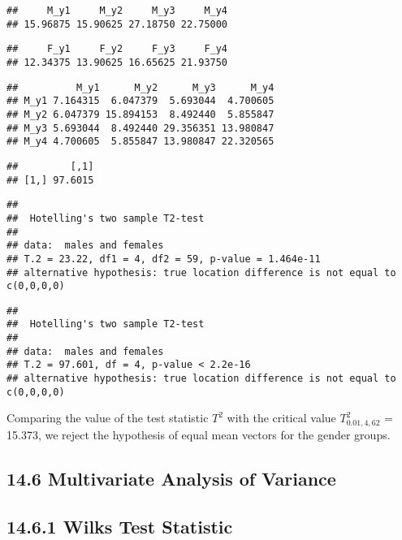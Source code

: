 \documentclass[]{article}
\begin{document}
\begin{verbatim}
##     M_y1     M_y2     M_y3     M_y4 
## 15.96875 15.90625 27.18750 22.75000
\end{verbatim}

\begin{verbatim}
##     F_y1     F_y2     F_y3     F_y4 
## 12.34375 13.90625 16.65625 21.93750
\end{verbatim}

\begin{verbatim}
##          M_y1      M_y2      M_y3      M_y4
## M_y1 7.164315  6.047379  5.693044  4.700605
## M_y2 6.047379 15.894153  8.492440  5.855847
## M_y3 5.693044  8.492440 29.356351 13.980847
## M_y4 4.700605  5.855847 13.980847 22.320565
\end{verbatim}

\begin{verbatim}
##         [,1]
## [1,] 97.6015
\end{verbatim}

\begin{verbatim}
## 
##  Hotelling's two sample T2-test
## 
## data:  males and females
## T.2 = 23.22, df1 = 4, df2 = 59, p-value = 1.464e-11
## alternative hypothesis: true location difference is not equal to c(0,0,0,0)
\end{verbatim}

\begin{verbatim}
## 
##  Hotelling's two sample T2-test
## 
## data:  males and females
## T.2 = 97.601, df = 4, p-value < 2.2e-16
## alternative hypothesis: true location difference is not equal to c(0,0,0,0)
\end{verbatim}

Comparing the value of the test statistic \(T^2\) with the critical
value \(T^2_{0.01, 4, 62}\) = 15.373, we reject the hypothesis of equal
mean vectors for the gender groups.

\hypertarget{multivariate-analysis-of-variance}{%
\subsection{14.6 Multivariate Analysis of
Variance}\label{multivariate-analysis-of-variance}}

\hypertarget{wilks-test-statistic}{%
\subsection{14.6.1 Wilks Test Statistic}\label{wilks-test-statistic}}
\end{document}
